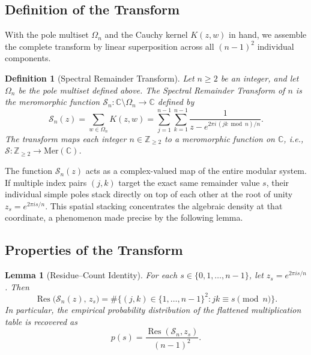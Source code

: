 \documentclass[11pt,twoside]{article}
\newtheorem{lemma}{Lemma}
\newtheorem{definition}{Definition}
\begin{document}
	\subsection{Definition of the Transform}
	With the pole multiset $\Omega_n$ and the Cauchy kernel $K(z,w)$ in hand, we assemble the complete transform by linear superposition across all $(n-1)^2$ individual components.
	
	\begin{definition}[Spectral Remainder Transform]
		Let $n \geq 2$ be an integer, and let $\Omega_n$ be the pole multiset defined above. The \emph{Spectral Remainder Transform} of $n$ is the meromorphic function $\mathcal{S}_n : \mathbb{C} \setminus \Omega_n \to \mathbb{C}$ defined by
		\begin{equation}
			\mathcal{S}_n(z) = \sum_{w \in \Omega_n} K(z, w) = \sum_{j=1}^{n-1} \sum_{k=1}^{n-1} \frac{1}{z - e^{2\pi i \, (jk \bmod n)/n}}.
		\end{equation}
		The transform maps each integer $n \in \mathbb{Z}_{\geq 2}$ to a meromorphic function on $\mathbb{C}$, i.e., $\mathcal{S} : \mathbb{Z}_{\geq 2} \to \mathrm{Mer}(\mathbb{C})$.
	\end{definition}
	
	The function $\mathcal{S}_n(z)$ acts as a complex-valued map of the entire modular system. If multiple index pairs $(j,k)$ target the exact same remainder value $s$, their individual simple poles stack directly on top of each other at the root of unity $z_s = e^{2\pi i s/n}$. This spatial stacking concentrates the algebraic density at that coordinate, a phenomenon made precise by the following lemma.
	
	\subsection{Properties of the Transform}
	
	\begin{lemma}[Residue--Count Identity]
		For each $s \in \{0, 1, \dotsc, n-1\}$, let $z_s = e^{2\pi i s/n}$. Then
		\begin{equation}
			\operatorname{Res}\bigl(\mathcal{S}_n(z),\, z_s\bigr) = \#\bigl\{(j,k) \in \{1,\dotsc,n-1\}^2 : jk \equiv s \pmod{n} \bigr\}.
		\end{equation}
		In particular, the empirical probability distribution of the flattened multiplication table is recovered as
		\begin{equation}
			p(s) = \frac{\operatorname{Res}(\mathcal{S}_n, z_s)}{(n-1)^2}.
		\end{equation}
	\end{lemma}
	
\end{document}
